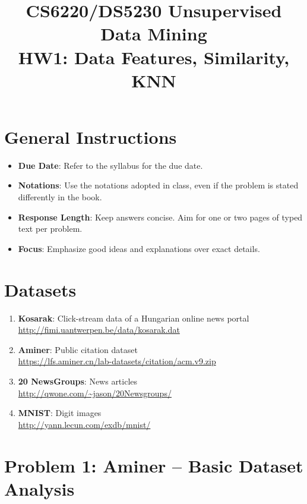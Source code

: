 \documentclass{article}
\title{CS6220/DS5230 Unsupervised Data Mining\\HW1: Data Features, Similarity, KNN}
\date{}
\begin{document}
\maketitle

\section*{General Instructions}
\begin{itemize}
    \item \textbf{Due Date}: Refer to the syllabus for the due date.
    \item \textbf{Notations}: Use the notations adopted in class, even if the problem is stated differently in the book.
    \item \textbf{Response Length}: Keep answers concise. Aim for one or two pages of typed text per problem.
    \item \textbf{Focus}: Emphasize good ideas and explanations over exact details.
\end{itemize}

\section*{Datasets}
\begin{enumerate}
    \item \textbf{Kosarak}: Click-stream data of a Hungarian online news portal\\
    \url{http://fimi.uantwerpen.be/data/kosarak.dat}
    \item \textbf{Aminer}: Public citation dataset\\
    \url{https://lfs.aminer.cn/lab-datasets/citation/acm.v9.zip}
    \item \textbf{20 NewsGroups}: News articles\\
    \url{http://qwone.com/~jason/20Newsgroups/}
    \item \textbf{MNIST}: Digit images\\
    \url{http://yann.lecun.com/exdb/mnist/}
\end{enumerate}

\section*{Problem 1: Aminer -- Basic Dataset Analysis}
\end{document}
